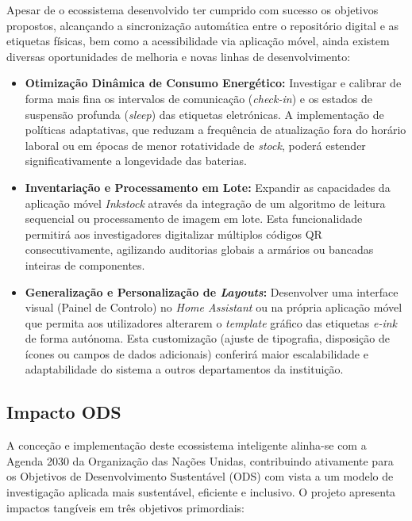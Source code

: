 \documentclass[10pt]{article}
\begin{document}
Apesar de o ecossistema desenvolvido ter cumprido com sucesso os objetivos propostos, alcançando a sincronização automática entre o repositório digital e as etiquetas físicas, bem como a acessibilidade via aplicação móvel, ainda existem diversas oportunidades de melhoria e novas linhas de desenvolvimento:

\begin{itemize}
    \item \textbf{Otimização Dinâmica de Consumo Energético:} Investigar e calibrar de forma mais fina os intervalos de comunicação (\textit{check-in}) e os estados de suspensão profunda (\textit{sleep}) das etiquetas eletrónicas. A implementação de políticas adaptativas, que reduzam a frequência de atualização fora do horário laboral ou em épocas de menor rotatividade de \textit{stock}, poderá estender significativamente a longevidade das baterias.
    \item \textbf{Inventariação e Processamento em Lote:} Expandir as capacidades da aplicação móvel \textit{Inkstock} através da integração de um algoritmo de leitura sequencial ou processamento de imagem em lote. Esta funcionalidade permitirá aos investigadores digitalizar múltiplos códigos QR consecutivamente, agilizando auditorias globais a armários ou bancadas inteiras de componentes.
    \item \textbf{Generalização e Personalização de \textit{Layouts}:} Desenvolver uma interface visual (Painel de Controlo) no \textit{Home Assistant} ou na própria aplicação móvel que permita aos utilizadores alterarem o \textit{template} gráfico das etiquetas \textit{e-ink} de forma autónoma. Esta customização (ajuste de tipografia, disposição de ícones ou campos de dados adicionais) conferirá maior escalabilidade e adaptabilidade do sistema a outros departamentos da instituição.
\end{itemize}

\subsection{Impacto ODS}

A conceção e implementação deste ecossistema inteligente alinha-se com a Agenda 2030 da Organização das Nações Unidas, contribuindo ativamente para os Objetivos de Desenvolvimento Sustentável (ODS) com vista a um modelo de investigação aplicada mais sustentável, eficiente e inclusivo. O projeto apresenta impactos tangíveis em três objetivos primordiais:
\end{document}
